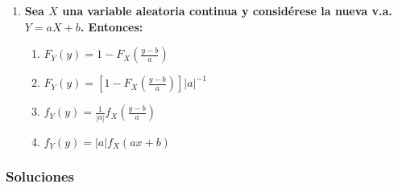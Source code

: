 \documentclass[fleqn]{article}
\begin{document}
\begin{enumerate}
\begin{enumerate}
\begin{enumerate}
                                        \end{enumerate}
                                \item \textbf{Sea $X$ una variable aleatoria continua y considérese la nueva v.a. $Y = aX + b$. Entonces:}
                                        \begin{enumerate}
                                                \item $F_Y (y) = 1 - F_X \left(\frac{y-b}{a}\right)$
                                                \item $F_Y (y) = \left[1 - F_X \left(\frac{y-b}{a}\right)\right] |a|^{-1}$
                                                \item $f_Y (y) = \frac{1}{|a|} f_X \left(\frac{y-b}{a}\right) $
                                                \item $f_Y (y) = |a| f_X (ax+b)$
                                        \end{enumerate}
                        \end{enumerate}

                
                \newpage

                \subsubsection{Soluciones}
                        

\end{enumerate}
\end{document}
